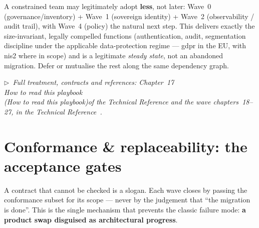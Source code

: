 \documentclass[11pt,a4paper,twoside]{article}
\newcommand{\keyword}[1]{\textbf{#1}}
\newcommand{\trchap}[2]{%
  Chapter~#1%
  \ifx\\#2\\\else\space(\emph{#2})\fi\space of the Technical Reference%
}
\newcommand{\mainref}[1]{%
  \par\vspace{1pt}
  {\footnotesize\color{gray}\itshape
  $\triangleright$~Full treatment, contracts and references: #1,
  in the Technical Reference~\cite{ng-tech-ref-2026}.}\par\vspace{2pt}}
\begin{document}
\begin{principlebox}
A constrained team may legitimately adopt \keyword{less}, not later: Wave~0
(governance/inventory) + Wave~1 (sovereign identity) + Wave~2 (observability
/ audit trail), with Wave~4 (policy) the natural next step. This delivers
exactly the size-invariant, legally compelled functions (authentication,
audit, segmentation discipline under the applicable data-protection
regime --- \gls{gdpr} in the EU, with \gls{nis2} where in scope) and is a legitimate \emph{steady state}, not an abandoned
migration. Defer or mutualise the rest along the same dependency graph.
\end{principlebox}

\mainref{\trchap{17}{How to read this playbook} and the wave
chapters~18--27}

\section{Conformance \& replaceability: the acceptance gates}

A contract that cannot be checked is a slogan. Each wave closes by passing
the conformance subset for its scope --- never by the judgement that ``the
migration is done''. This is the single mechanism that prevents the classic
failure mode: \keyword{a product swap disguised as architectural progress}.
\end{document}
